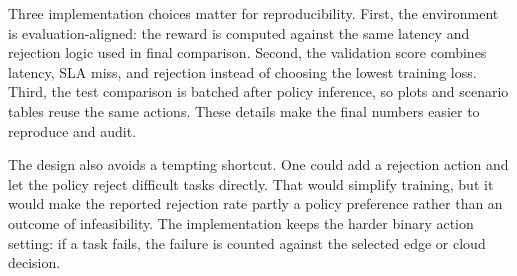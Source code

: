 Three implementation choices matter for reproducibility. First, the environment is evaluation-aligned: the reward is computed against the same latency and rejection logic used in final comparison. Second, the validation score combines latency, SLA miss, and rejection instead of choosing the lowest training loss. Third, the test comparison is batched after policy inference, so plots and scenario tables reuse the same actions. These details make the final numbers easier to reproduce and audit.

The design also avoids a tempting shortcut. One could add a rejection action and let the policy reject difficult tasks directly. That would simplify training, but it would make the reported rejection rate partly a policy preference rather than an outcome of infeasibility. The implementation keeps the harder binary action setting: if a task fails, the failure is counted against the selected edge or cloud decision.
